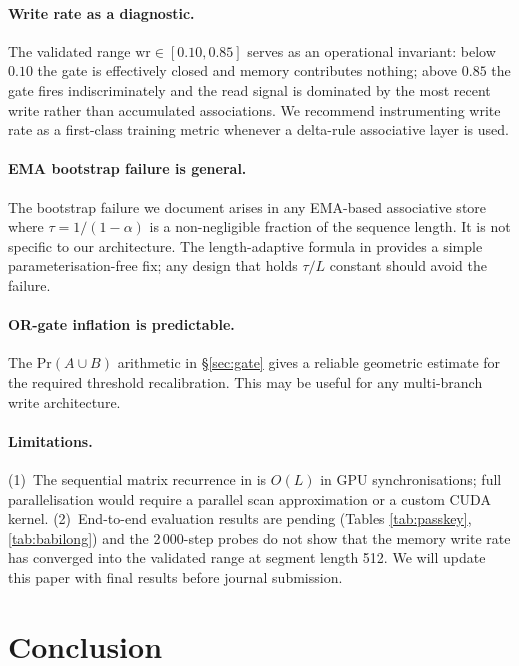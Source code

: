 \documentclass{article}
\begin{document}
\paragraph{Write rate as a diagnostic.}
The validated range $\mathrm{wr} \in [0.10, 0.85]$ serves as an operational invariant:
below $0.10$ the gate is effectively closed and memory contributes nothing; above $0.85$
the gate fires indiscriminately and the read signal is dominated by the most recent write
rather than accumulated associations.  We recommend instrumenting write rate as a
first-class training metric whenever a delta-rule associative layer is used.

\paragraph{EMA bootstrap failure is general.}
The bootstrap failure we document arises in any EMA-based associative store where
$\tau = 1/(1-\alpha)$ is a non-negligible fraction of the sequence length.  It is not
specific to our architecture.  The length-adaptive formula in 
provides a simple parameterisation-free fix; any design that holds $\tau/L$ constant
should avoid the failure.

\paragraph{OR-gate inflation is predictable.}
The Pr$(A \cup B)$ arithmetic in \S\ref{sec:gate} gives a reliable geometric estimate
for the required threshold recalibration.  This may be useful for any multi-branch
write architecture.

\paragraph{Limitations.}
(1)~The sequential matrix recurrence in  is $O(L)$ in GPU
synchronisations; full parallelisation would require a parallel scan approximation or a
custom CUDA kernel.  (2)~End-to-end evaluation results are pending (Tables
\ref{tab:passkey}, \ref{tab:babilong}) and the 2\,000-step probes do not show that the
memory write rate has converged into the validated range at segment length 512.  We will
update this paper with final results before journal submission.

\section{Conclusion}
\label{sec:conclusion}
\end{document}

